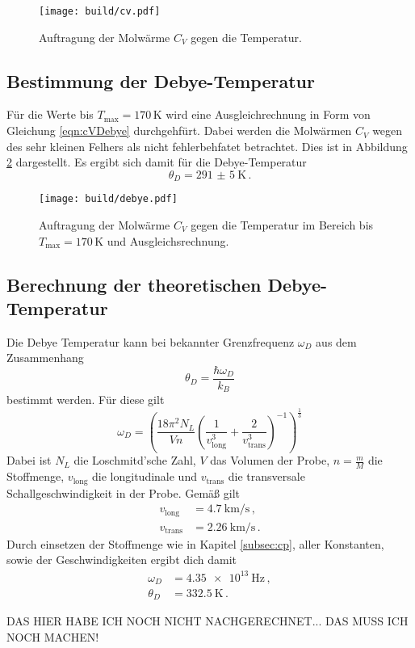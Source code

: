 \begin{figure}
  \centering
  \texttt{[image: build/cv.pdf]}
  \caption{Auftragung der Molwärme $C_V$ gegen die Temperatur.}
  \label{fig:cv}
\end{figure}

\subsection{Bestimmung der Debye-Temperatur}
\label{subsec:debye}

Für die Werte bis $T_{\text{max}}=170$\,K wird eine Ausgleichrechnung in Form von Gleichung \eqref{eqn:cVDebye}
durchgehfürt. Dabei werden die Molwärmen $C_V$ wegen des sehr kleinen Felhers als
nicht fehlerbehfatet betrachtet. Dies ist in Abbildung \ref{fig:debye} dargestellt. Es ergibt sich
damit für die Debye-Temperatur
\begin{equation*}
  \theta_D=\SI{291(5)}{\kelvin} \,.
\end{equation*}

\begin{figure}
  \centering
  \texttt{[image: build/debye.pdf]}
  \caption{Auftragung der Molwärme $C_V$ gegen die Temperatur im Bereich bis
  $T_{\text{max}}=170$\,K und Ausgleichsrechnung.}
  \label{fig:debye}
\end{figure}

\subsection{Berechnung der theoretischen Debye-Temperatur}
\label{subsec:debyetheo}

Die Debye Temperatur kann bei bekannter Grenzfrequenz $\omega_D$ aus dem Zusammenhang
\begin{equation*}
  \theta_D=\frac{\hbar \omega_D}{k_B}
\end{equation*}
bestimmt werden. Für diese gilt
\begin{equation*}
  \omega_D=\left(\frac{18 \pi^2 N_L}{V n}\left(\frac{1}{v_{\text{long}}^3}+
  \frac{2}{v_{\text{trans}}^3} \right)^{-1} \right)^{\frac{1}{3}}
\end{equation*}
Dabei ist $N_L$ die Loschmitd'sche Zahl, $V$ das Volumen der Probe, $n=\frac{m}{M}$ die Stoffmenge,
$v_{\text{long}}$ die longitudinale und $v_{\text{trans}}$ die transversale Schallgeschwindigkeit
in der Probe. Gemäß \cite{versuchsanleitung} gilt
\begin{align*}
  v_{\text{long}}&= \SI{4.7}{\kilo\metre\per\second} \,,\\
  v_{\text{trans}}&=\SI{2.26}{\kilo\metre\per\second} \,.
\end{align*}
Durch einsetzen der Stoffmenge wie in Kapitel \ref{subsec:cp}, aller Konstanten,
sowie der Geschwindigkeiten ergibt dich damit
\begin{align*}
  \omega_D&=\SI{4.35e13}{\hertz} \,, \\
  \theta_D&=\SI{332.5}{\kelvin} \,.
\end{align*}

DAS HIER HABE ICH NOCH NICHT NACHGERECHNET... DAS MUSS ICH NOCH MACHEN!
